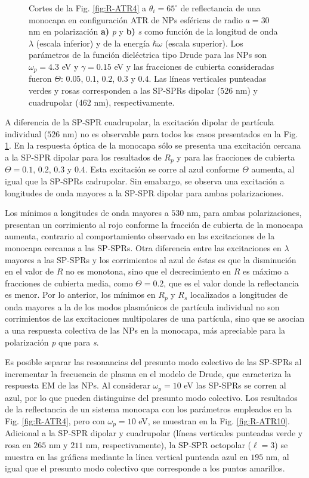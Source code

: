 \begin{figure}[h!]
	\caption{Cortes de la Fig. \ref{fig:R-ATR4} a $\theta_i = 65^\circ$ de reflectancia de una monocapa en configuración ATR de NPs esféricas de radio $a=30$ nm en polarización \textbf{a)} \emph{p} y \textbf{b)} \emph{s} como función de la longitud de onda $\lambda$ (escala inferior) y de la energía $\hbar \omega$ (escala superior). Los parámetros de la función dieléctrica tipo Drude para las NPs son $\omega_p = 4.3$ eV y $\gamma = 0.15$ eV y las fracciones de cubierta consideradas fueron $\Theta$: $0. 05$, $0. 1$, $0. 2$, $0. 3$ y $0. 4$. Las líneas verticales punteadas verdes y rosas corresponden a las SP-SPRs dipolar ($526$ nm) y cuadrupolar ($462$ nm), respectivamente.  }\label{fig:R-ATR4-Cuts}
	\end{figure}	  
    
A diferencia de la SP-SPR cuadrupolar, la excitación dipolar de partícula individual ($526$ nm) no es observable para todos los casos presentados en la Fig. \ref{fig:R-ATR4-Cuts}. En la respuesta óptica de la monocapa sólo se presenta una excitación cercana a la SP-SPR dipolar para los resultados de $R_p$ y para las fracciones de cubierta $\Theta = 0.1,\,0.2,\,0.3$ y $0.4$. Esta excitación se corre al azul conforme $\Theta$ aumenta, al igual que la SP-SPRs cadrupolar. Sin emabargo, se observa una excitación a longitudes de onda mayores a la SP-SPR dipolar para ambas polarizaciones.
 
Los mínimos a longitudes de onda mayores a $530$ nm, para ambas polarizaciones, presentan un corrimiento al rojo conforme la fracción de cubierta de la monocapa aumenta, contrario al comportamiento observado en las excitaciones de la monocapa cercanas a las SP-SPRs. Otra diferencia entre las excitaciones en $\lambda$ mayores a las SP-SPRs y los corrimientos al azul de éstas es que la disminución en el valor de $R$ no es monotona, sino que el decrecimiento en $R$ es máximo a fracciones de cubierta media, como $\Theta=0.2$, que es el valor donde la reflectancia es menor. Por lo anterior, los mínimos en $R_p$ y $R_s$ localizados a longitudes de onda mayores a la de los modos plasmónicos de partícula individual no son corrimientos de las excitaciones multipolares de una partícula, sino que se asocian a una respuesta colectiva de las NPs en la monocapa, más apreciable para la polarización \emph{p} que para \emph{s}.

Es posible separar las resonancias del presunto modo colectivo de las SP-SPRs al incrementar la frecuencia de plasma en el modelo de Drude, que caracteriza la respuesta EM de las NPs. Al considerar $\omega_p = 10$ eV las SP-SPRs se corren al azul, por lo que pueden distinguirse del presunto modo colectivo. Los resultados de la reflectancia de un sistema monocapa con los parámetros empleados en la Fig. \ref{fig:R-ATR4}, pero con $\omega_p = 10$ eV, se muestran en la Fig. \ref{fig:R-ATR10}. Adicional a la SP-SPR dipolar y cuadrupolar (líneas verticales punteadas verde y rosa en $265$ nm y $211$ nm, respectivamente), la SP-SPR octopolar ($\ell = 3$) se muestra en las gráficas mediante la línea vertical punteada azul en $195$ nm, al igual que el presunto modo colectivo que corresponde a los puntos amarillos.
	
